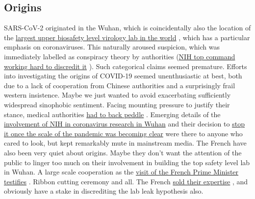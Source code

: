 \documentclass[11pt,a4paper,notitlepage]{report}
\begin{document}


\subsection*{Origins}

SARS-CoV-2 originated in the Wuhan, which is coincidentally also the location of the \href{https://theconversation.com/fifty-nine-labs-around-world-handle-the-deadliest-pathogens-only-a-quarter-score-high-on-safety-161777}{largest upper biosafety level virology lab in the world} \cite{theconversation14062021}, which has a particular emphasis on coronaviruses. This naturally aroused suspicion, which was immediately labelled as conspiracy theory by authorities (\href{https://nypost.com/2022/01/11/fauci-called-wuhan-lab-leak-theory-shiny-object-in-april-2020-email/}{NIH top command working hard to discredit it} \cite{newyorkpost11012022}). Such categorical claims seemed premature. Efforts into investigating the origins of COVID-19 seemed unenthusiastic at best, both due to a lack of cooperation from Chinese authorities and a surprisingly frail western insistence. Maybe we just wanted to avoid exacerbating sufficiently widespread sinophobic sentiment. Facing mounting pressure to justify their stance, medical authorities \href{https://www.theguardian.com/world/2021/jul/16/who-chief-says-push-to-discount-lab-leak-theory-was-premature}{had to back peddle} \cite{guardian16072021}. Emerging details of the \href{https://www.vanityfair.com/news/2021/10/nih-admits-funding-risky-virus-research-in-wuhan}{involvement of NIH in coronavirus research in Wuhan} \cite{vanityfair22102021} and their decision to \href{https://www.the-scientist.com/news-opinion/nih-cancels-funding-for-bat-coronavirus-research-project-67486}{stop it once the scale of the pandemic was becoming clear} \cite{scientist29042020} were there to anyone who cared to look, but kept remarkably mute in mainstream media. The French have also been very quiet about origins. Maybe they don't want the attention of the public to linger too much on their involvement in building the top safety level lab in Wuhan. A large scale cooperation as the \href{http://english.whiov.cas.cn/ne/201802/t20180208_189991.html}{visit of the French Prime Minister testifies} \cite{wiv27022017}. Ribbon cutting ceremony and all. The French \href{https://www.challenges.fr/entreprise/sante-et-pharmacie/revelations-l-histoire-secrete-du-laboratoire-p4-de-wuhan-vendu-par-la-france-a-la-chine_707425}{sold their expertise} \cite{challenges30042020}, and obviously have a stake in discrediting the lab leak hypothesis also. 
\end{document}
